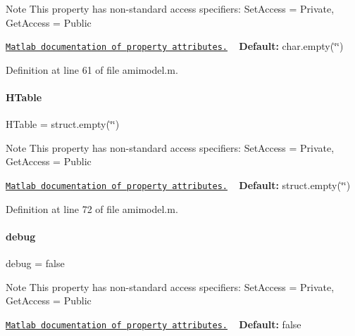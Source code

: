 \begin{DoxyNote}{Note}
This property has non-\/standard access specifiers\+: {\ttfamily Set\+Access = Private, Get\+Access = Public} 

\href{http://www.mathworks.com/help/matlab/matlab_oop/property-attributes.html}{\tt Matlab documentation of property attributes.} ~\newline
{\bfseries Default\+:} char.\+empty(\char`\"{}\char`\"{}) 
\end{DoxyNote}


Definition at line 61 of file amimodel.\+m.

\mbox{\label{classamimodel_aafe6335df413dd688a2f44efba012cf1}} 
\paragraph{\texorpdfstring{H\+Table}{HTable}}
{\footnotesize\ttfamily H\+Table = struct.\+empty(\char`\"{}\char`\"{})}

\begin{DoxyNote}{Note}
This property has non-\/standard access specifiers\+: {\ttfamily Set\+Access = Private, Get\+Access = Public} 

\href{http://www.mathworks.com/help/matlab/matlab_oop/property-attributes.html}{\tt Matlab documentation of property attributes.} ~\newline
{\bfseries Default\+:} struct.\+empty(\char`\"{}\char`\"{}) 
\end{DoxyNote}


Definition at line 72 of file amimodel.\+m.

\mbox{\label{classamimodel_a0514aabed091ee5e2f35766eb01eced6}} 
\paragraph{\texorpdfstring{debug}{debug}}
{\footnotesize\ttfamily debug = false}

\begin{DoxyNote}{Note}
This property has non-\/standard access specifiers\+: {\ttfamily Set\+Access = Private, Get\+Access = Public} 

\href{http://www.mathworks.com/help/matlab/matlab_oop/property-attributes.html}{\tt Matlab documentation of property attributes.} ~\newline
{\bfseries Default\+:} false 
\end{DoxyNote}


